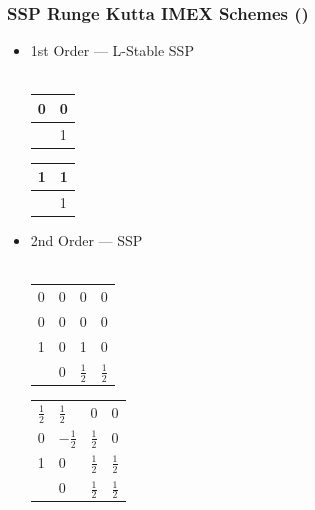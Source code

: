 \documentclass[10pt]{beamer}
\begin{document}
\begin{frame}
  \frametitle{SSP Runge Kutta IMEX Schemes (\textcite{pareschi2000implicit})}
  \begin{itemize}
    \item 1st Order --- L-Stable SSP \hfill \\ \hfill \\
          \begin{tabular}{r|l}
            0 & 0 \\
            \midrule
              & 1
          \end{tabular}\hspace{0.5cm}
          \begin{tabular}{r|l}
            1 & 1 \\
            \midrule
              & 1
          \end{tabular}

          \vspace{0.5cm}

    \item 2nd Order --- SSP \hfill \\ \hfill \\
          \begin{tabular}{r|lll}
            0 & 0 & 0               & 0               \\
            0 & 0 & 0               & 0               \\
            1 & 0 & 1               & 0               \\
            \midrule
              & 0 & \(\frac{1}{2}\) & \(\frac{1}{2}\) \\
          \end{tabular}\hspace{0.5cm}
          \begin{tabular}{r|lll}
            \(\frac{1}{2}\) & \(\frac{1}{2}\)  & 0               & 0               \\
            0               & \(-\frac{1}{2}\) & \(\frac{1}{2}\) & 0               \\
            1               & 0                & \(\frac{1}{2}\) & \(\frac{1}{2}\) \\
            \midrule
                            & 0                & \(\frac{1}{2}\) & \(\frac{1}{2}\) \\
          \end{tabular}
  \end{itemize}
\end{frame}
\end{document}
